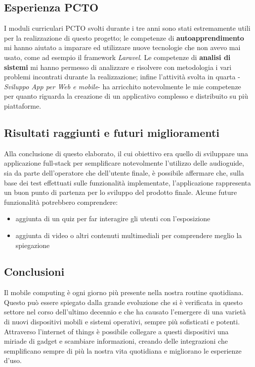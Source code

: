 \documentclass[12pt]{article}
\begin{document}
\subsection{Esperienza PCTO}
I moduli curriculari PCTO svolti durante i tre anni sono stati estremamente utili per la realizzazione di questo progetto; le competenze di \textbf{autoapprendimento} mi hanno aiutato a imparare ed utilizzare nuove tecnologie che non avevo mai usato, come ad esempio il framework \emph{Laravel}. Le competenze di \textbf{analisi di sistemi} mi hanno permesso di analizzare e risolvere con metodologia i vari problemi incontrati durante la realizzazione; infine l'attività svolta in quarta -\emph{Sviluppo App per Web e mobile}- ha arricchito notevolmente le mie competenze per quanto riguarda la creazione di un applicativo complesso e distribuito su più piattaforme.

\subsection{Risultati raggiunti e futuri miglioramenti}
Alla conclusione di questo elaborato, il cui obiettivo era quello di sviluppare una applicazione full-stack per semplificare notevolmente l'utilizzo delle audioguide, sia da parte dell'operatore che dell'utente finale, è possibile affermare che, sulla base dei test effettuati sulle funzionalità implementate, l'applicazione rappresenta un buon punto di partenza per lo sviluppo del prodotto finale. Alcune future funzionalità potrebbero comprendere:
\begin{itemize}
    \item aggiunta di un quiz per far interagire gli utenti con l'esposizione
    \item aggiunta di video o altri contenuti multimediali per comprendere meglio la spiegazione
\end{itemize} 


\subsection{Conclusioni}


Il mobile computing è ogni giorno più presente nella nostra routine quotidiana. Questo può essere spiegato dalla grande evoluzione che si è verificata in questo settore nel corso dell'ultimo decennio e che ha causato l'emergere di una varietà di nuovi dispositivi mobili e sistemi operativi, sempre più sofisticati e potenti.  Attraverso l'internet of things è possibile collegare a questi dispositivi una miriade di gadget e scambiare informazioni, creando delle integrazioni che semplificano sempre di più la nostra vita quotidiana e migliorano le esperienze d'uso.

\printbibliography
\end{document}
